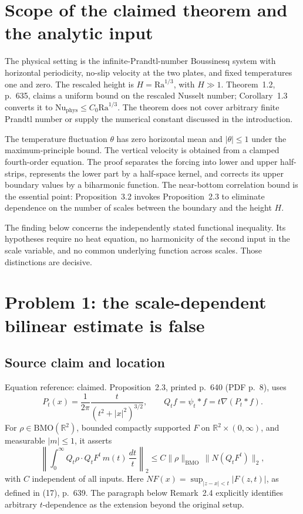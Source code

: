 \documentclass[10pt]{article}
\begin{document}
\section*{Scope of the claimed theorem and the analytic input}
The physical setting is the infinite-Prandtl-number Boussinesq system with horizontal periodicity, no-slip velocity at the two plates, and fixed temperatures one and zero. The rescaled height is \(H=\mathrm{Ra}^{1/3}\), with \(H\gg1\). Theorem 1.2, p. 635, claims a uniform bound on the rescaled Nusselt number; Corollary 1.3 converts it to \(\mathrm{Nu}_{\mathrm{phys}}\le C_0\mathrm{Ra}^{1/3}\). The theorem does not cover arbitrary finite Prandtl number or supply the numerical constant discussed in the introduction.\par
The temperature fluctuation \(\theta\) has zero horizontal mean and \(|\theta|\le1\) under the maximum-principle bound. The vertical velocity is obtained from a clamped fourth-order equation. The proof separates the forcing into lower and upper half-strips, represents the lower part by a half-space kernel, and corrects its upper boundary values by a biharmonic function. The near-bottom correlation bound is the essential point: Proposition 3.2 invokes Proposition 2.3 to eliminate dependence on the number of scales between the boundary and the height \(H\).\par
The finding below concerns the independently stated functional inequality. Its hypotheses require no heat equation, no harmonicity of the second input in the scale variable, and no common underlying function across scales. Those distinctions are decisive.\par
\section*{Problem 1: the scale-dependent bilinear estimate is false}
\subsection*{Source claim and location}
Equation reference: claimed. Proposition 2.3, printed p. 640 (PDF p. 8), uses \[P_t(x)=\frac{1}{2\pi}\frac{t}{(t^2+|x|^2)^{3/2}},
 \qquad Q_tf=\psi_t*f=t\nabla(P_t*f).\] For \(\rho\in\mathrm{BMO}(\mathbb R^2)\), bounded compactly supported \(F\) on \(\mathbb R^2\times(0,\infty)\), and measurable \(|m|\le1\), it asserts \[
 \left\|\int_0^\infty Q_t\rho\cdot Q_tF^t\,m(t)\,\frac{dt}{t}\right\|_2
 \le C\|\rho\|_{\mathrm{BMO}}\,\|N(Q_tF^t)\|_2 ,\] with \(C\) independent of all inputs. Here \(NF(x)=\sup_{|z-x|<t}|F(z,t)|\), as defined in (17), p. 639. The paragraph below Remark 2.4 explicitly identifies arbitrary \(t\)-dependence as the extension beyond the original setup.\par
\end{document}
